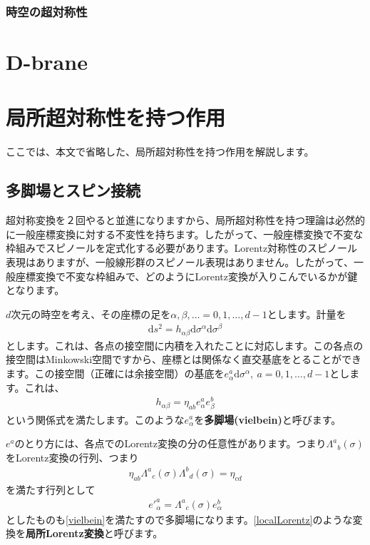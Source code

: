 \documentclass[report,paper=a4, fontsize=12pt, line_length=16cm, number_of_lines=33,dvipdfmx]{jlreq}
\numberwithin{equation}{chapter}
\numberwithin{equation}{section}
\newcommand{\kyou}[1]{{\sffamily \bfseries #1}}
\newcommand{\di}{\mathrm{d}}
\begin{document}
\subsection{時空の超対称性}

\chapter{D-brane}


\appendix
\chapter{局所超対称性を持つ作用}
\label{app:localSUSY}
ここでは、本文で省略した、局所超対称性を持つ作用を解説します。

\section{多脚場とスピン接続}
超対称変換を２回やると並進になりますから、局所超対称性を持つ理論は必然的に一般座標変換に対する不変性を持ちます。したがって、一般座標変換で不変な枠組みでスピノールを定式化する必要があります。Lorentz対称性のスピノール表現はありますが、一般線形群のスピノール表現はありません。したがって、一般座標変換で不変な枠組みで、どのようにLorentz変換が入りこんでいるかが鍵となります。

$d$次元の時空を考え、その座標の足を$\alpha,\beta,\dots=0,1,\dots,d-1$とします。計量を
\begin{align}
  \di s^2 = h_{\alpha\beta} \di \sigma^{\alpha}\di \sigma^{\beta}
\end{align}
とします。これは、各点の接空間に内積を入れたことに対応します。この各点の接空間はMinkowski空間ですから、座標とは関係なく直交基底をとることができます。この接空間（正確には余接空間）の基底を$e^{a}_{\alpha}\di \sigma^{\alpha}, \ a=0,1,\dots,d-1$とします。これは、
\begin{align}
  h_{\alpha\beta}=\eta_{ab}e^{a}_{\alpha}e^{b}_{\beta}\label{vielbein}
\end{align}
という関係式を満たします。このような$e^{a}_{\alpha}$を\kyou{多脚場(vielbein)}と呼びます。

$e^{a}$のとり方には、各点でのLorentz変換の分の任意性があります。つまり$\Lambda^{a}{}_{b}(\sigma)$をLorentz変換の行列、つまり
\begin{align}
  \eta_{ab}\Lambda^{a}{}_{c}(\sigma)\Lambda^{b}{}_{d}(\sigma)=\eta_{cd}
\end{align}
を満たす行列として
\begin{align}
  e'^{a}_{\alpha}=\Lambda^{a}{}_{c}(\sigma)e^{b}_{\alpha}
  \label{localLorentz}
\end{align}
としたものも\eqref{vielbein}を満たすので多脚場になります。\eqref{localLorentz}のような変換を\kyou{局所Lorentz変換}と呼びます。
\end{document}
